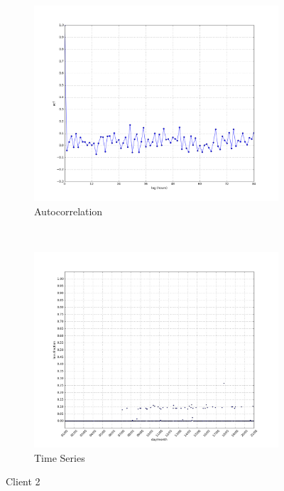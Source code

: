 \begin{figure}[H]
    \centering
    \begin{subfigure}[b]{0.5\textwidth}
        \centering
        \includegraphics[width=1.0\textwidth]{./figures/acf_BREDTCSRV20_64:66:B3:7B:9E:6A.png}
        \caption{Autocorrelation}
    \end{subfigure}%
    ~ 
    \begin{subfigure}[b]{0.5\textwidth}
        \centering
        \includegraphics[width=1.0\textwidth]{./figures/ts_BREDTCSRV20_64:66:B3:7B:9E:6A.png}
        \caption{Time Series}
    \end{subfigure}
    \caption{Client 2}
    \label{fig:acf_ts_2}
\end{figure}

